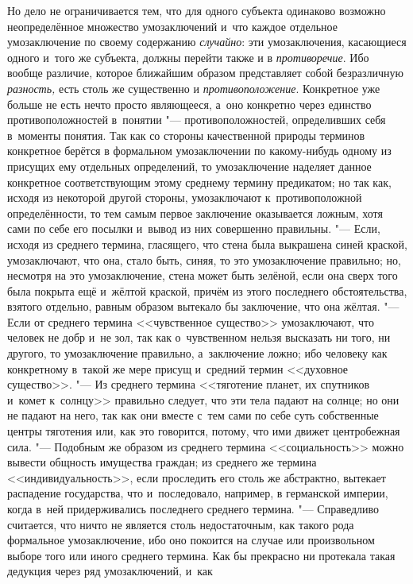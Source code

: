 Но дело не ограничивается тем, что для одного субъекта
одинаково возможно неопределённое множество умозаключений и~что каждое
отдельное умозаключение по своему содержанию
{\em случайно}: эти
умозаключения, касающиеся одного и~того же субъекта, должны перейти также и
в {\em противоречие}. Ибо
вообще различие, которое ближайшим образом представляет собой безразличную
{\em разность,} есть
столь же существенно и
{\em противоположение}.
Конкретное уже больше не есть нечто просто являющееся, а~оно
конкретно через единство противоположностей в~понятии
"--- противоположностей, определивших себя в~моменты понятия.
Так как со стороны качественной природы терминов конкретное берётся в
формальном умозаключении по какому-нибудь одному из присущих ему отдельных
определений, то умозаключение наделяет данное конкретное соответствующим
этому среднему термину предикатом; но так как, исходя из некоторой другой
стороны, умозаключают к~противоположной определённости, то тем самым первое
заключение оказывается ложным, хотя сами по себе его посылки и~вывод из них
совершенно правильны. "--- Если, исходя из среднего термина,
гласящего, что стена была выкрашена синей краской, умозаключают, что она,
стало быть, синяя, то это умозаключение правильно; но, несмотря на это
умозаключение, стена может быть зелёной, если она сверх того была покрыта
ещё и~жёлтой краской, причём из этого последнего обстоятельства, взятого
отдельно, равным образом вытекало бы заключение, что она
жёлтая. "--- Если от среднего термина <<чувственное существо>>
умозаключают, что человек не добр и~не зол, так как о~чувственном нельзя
высказать ни того, ни другого, то умозаключение правильно, а~заключение
ложно; ибо человеку как конкретному в~такой же мере присущ и~средний термин
<<духовное существо>>. "--- Из среднего термина <<тяготение
планет, их спутников и~комет к~солнцу>> правильно следует, что эти тела
падают на солнце; но они не падают на него, так как они вместе с~тем сами
по себе суть собственные центры тяготения или, как это говорится, потому,
что ими движет центробежная сила. "--- Подобным же образом из
среднего термина <<социальность>> можно вывести общность имущества граждан;
из среднего же термина <<индивидуальность>>, если проследить его столь же
абстрактно, вытекает распадение государства, что и~последовало, например, в
германской империи, когда в~ней придерживались последнего среднего
термина. "--- Справедливо считается, что ничто не является
столь недостаточным, как такого рода формальное умозаключение, ибо оно
покоится на случае или произвольном выборе того или иного среднего термина.
Как бы прекрасно ни протекала такая дедукция через ряд умозаключений, и~как
